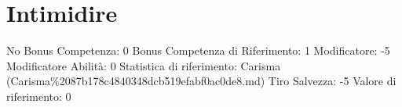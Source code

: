 \section{Intimidire}\label{intimidire}

\begin{description}
\tightlist
\item[Tags: ABI]
No Bonus Competenza: 0 Bonus Competenza di Riferimento: 1 Modificatore:
-5 Modificatore Abilità: 0 Statistica di riferimento: Carisma
(Carisma\%2087b178c4840348dcb519efabf0ac0de8.md) Tiro Salvezza: -5
Valore di riferimento: 0
\end{description}

